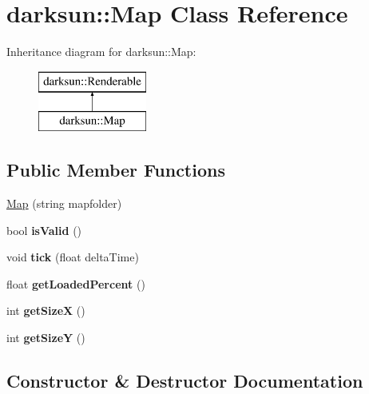 \hypertarget{classdarksun_1_1_map}{}\section{darksun\+::Map Class Reference}
\label{classdarksun_1_1_map}
Inheritance diagram for darksun\+::Map\+:\begin{figure}[H]
\begin{center}
\leavevmode
\includegraphics[height=2.000000cm]{classdarksun_1_1_map}
\end{center}
\end{figure}
\subsection*{Public Member Functions}
\begin{DoxyCompactItemize}
\item 
\mbox{\hyperlink{classdarksun_1_1_map_adcb452a39b2f4f997c6fe4ef041c290f}{Map}} (string mapfolder)
\item 
\mbox{\label{classdarksun_1_1_map_a40528a84d881252220c63636e14cc367}} 
bool {\bfseries is\+Valid} ()
\item 
\mbox{\label{classdarksun_1_1_map_ab74b11e561c85e585d186dbfbd62b167}} 
void {\bfseries tick} (float delta\+Time)
\item 
\mbox{\label{classdarksun_1_1_map_a57813d2ca838b6a9ef8ab7387af6415f}} 
float {\bfseries get\+Loaded\+Percent} ()
\item 
\mbox{\label{classdarksun_1_1_map_a05a8d0fa96e9f357e640f92b67cc2ed4}} 
int {\bfseries get\+SizeX} ()
\item 
\mbox{\label{classdarksun_1_1_map_a52990894010c256d65908af77f28218f}} 
int {\bfseries get\+SizeY} ()
\end{DoxyCompactItemize}


\subsection{Constructor \& Destructor Documentation}
\mbox{\label{classdarksun_1_1_map_adcb452a39b2f4f997c6fe4ef041c290f}} 
